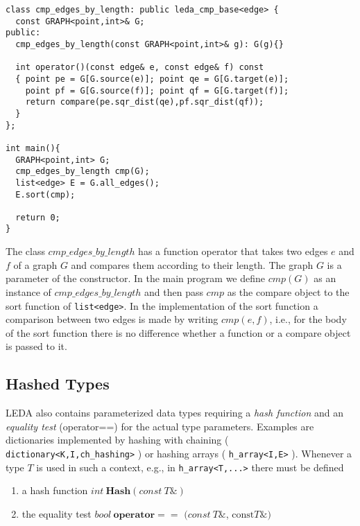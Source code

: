\begin{enumerate}
\begin{verbatim}
class cmp_edges_by_length: public leda_cmp_base<edge> { 
  const GRAPH<point,int>& G;
public:
  cmp_edges_by_length(const GRAPH<point,int>& g): G(g){}

  int operator()(const edge& e, const edge& f) const
  { point pe = G[G.source(e)]; point qe = G[G.target(e)];
    point pf = G[G.source(f)]; point qf = G[G.target(f)];
    return compare(pe.sqr_dist(qe),pf.sqr_dist(qf));
  } 
};
 
int main(){
  GRAPH<point,int> G;
  cmp_edges_by_length cmp(G);
  list<edge> E = G.all_edges();
  E.sort(cmp);

  return 0;
}
\end{verbatim}
The class $\mathit{cmp{\_}edges{\_}by{\_}length}$ has a function operator that takes
two edges $e$ and $f$ of a graph $G$ and compares them according to their
length. The graph $G$ is a parameter of the constructor. In the main program we
define $\mathit{cmp}(G)$ as an instance of $\mathit{cmp{\_}edges{\_}by{\_}length}$
and then pass $\mathit{cmp}$ as the compare object to the sort function of
\texttt{list<edge>}. In the implementation of the sort function a
comparison between two edges is made by writing $\mathit{cmp}(e,f)$, i.e., for
the body of the sort function there is no difference whether a function or a
compare object is passed to it.
\end{enumerate}


\subsection{Hashed Types} \label{Hashed Types}


LEDA also contains parameterized data types requiring a {\em hash function} and
an {\em equality test} (operator==) for the actual type parameters.  Examples
are dictionaries implemented by hashing with chaining (
\texttt{dictionary<K,I,ch\_hashing>} ) or hashing arrays
( \texttt{h\_array<I,E>} ).  Whenever a type $T$ is used in such a context,
e.g., in \texttt{h\_array<T,...>} there must be defined

\begin{enumerate}
\item a hash function $\mathit{int}\ \mathbf{Hash}(\mathit{const}\ T\&)$
\item the equality test $\mathit{bool}\ \mathbf{operator}==$
$(\mathit{const}\  T\&$, $\mathrm{const} T\&)$
\end{enumerate}

